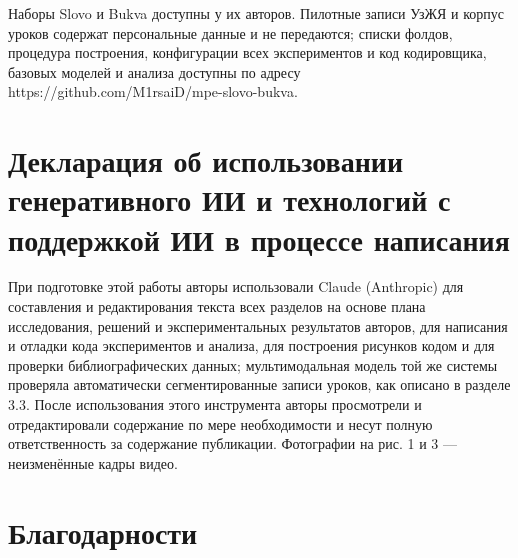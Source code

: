 \documentclass[a4paper,fleqn]{cas-dc}
\begin{document}
Наборы Slovo и Bukva доступны у их авторов. Пилотные записи УзЖЯ и корпус уроков содержат персональные данные и не передаются; списки фолдов, процедура построения, конфигурации всех экспериментов и код кодировщика, базовых моделей и анализа доступны по адресу https://github.com/M1rsaiD/mpe-slovo-bukva.

\hypertarget{ux434ux435ux43aux43bux430ux440ux430ux446ux438ux44f-ux43eux431-ux438ux441ux43fux43eux43bux44cux437ux43eux432ux430ux43dux438ux438-ux433ux435ux43dux435ux440ux430ux442ux438ux432ux43dux43eux433ux43e-ux438ux438-ux438-ux442ux435ux445ux43dux43eux43bux43eux433ux438ux439-ux441-ux43fux43eux434ux434ux435ux440ux436ux43aux43eux439-ux438ux438-ux432-ux43fux440ux43eux446ux435ux441ux441ux435-ux43dux430ux43fux438ux441ux430ux43dux438ux44f}{%
\section*{Декларация об использовании генеративного ИИ и технологий с поддержкой ИИ в процессе написания}\label{ux434ux435ux43aux43bux430ux440ux430ux446ux438ux44f-ux43eux431-ux438ux441ux43fux43eux43bux44cux437ux43eux432ux430ux43dux438ux438-ux433ux435ux43dux435ux440ux430ux442ux438ux432ux43dux43eux433ux43e-ux438ux438-ux438-ux442ux435ux445ux43dux43eux43bux43eux433ux438ux439-ux441-ux43fux43eux434ux434ux435ux440ux436ux43aux43eux439-ux438ux438-ux432-ux43fux440ux43eux446ux435ux441ux441ux435-ux43dux430ux43fux438ux441ux430ux43dux438ux44f}}

При подготовке этой работы авторы использовали Claude (Anthropic) \cite{2026_anthropic_claude} для составления и редактирования текста всех разделов на основе плана исследования, решений и экспериментальных результатов авторов, для написания и отладки кода экспериментов и анализа, для построения рисунков кодом и для проверки библиографических данных; мультимодальная модель той же системы проверяла автоматически сегментированные записи уроков, как описано в разделе 3.3. После использования этого инструмента авторы просмотрели и отредактировали содержание по мере необходимости и несут полную ответственность за содержание публикации. Фотографии на рис. 1 и 3 --- неизменённые кадры видео.

\hypertarget{ux431ux43bux430ux433ux43eux434ux430ux440ux43dux43eux441ux442ux438}{%
\section*{Благодарности}\label{ux431ux43bux430ux433ux43eux434ux430ux440ux43dux43eux441ux442ux438}}
\end{document}
